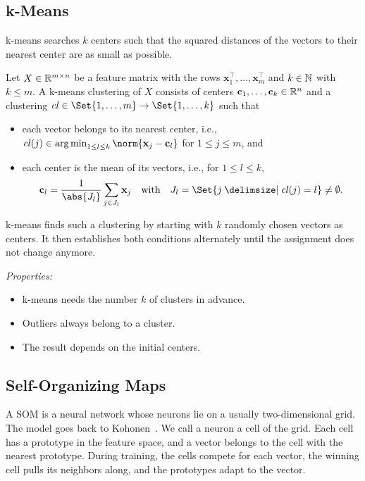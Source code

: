 \subsection{k-Means}
\label{sec:prelim:kmeans}
k-means searches $k$ centers such that the squared distances of the vectors to their nearest center are as small as possible.

\begin{definition}[k-Means]
	\label{def:prelim:kmeans}
	Let $X \in \mathbb R^{m \times n}$ be a feature matrix with the rows $\mathbf{x}_1^\top, \allowbreak \dots, \allowbreak \mathbf{x}_m^\top$ and $k \in \mathbb N$ with $k \le m$. A k-means clustering of $X$ consists of centers $\mathbf{c}_1, \dots, \mathbf{c}_k \in \mathbb R^n$ and a clustering $\mathit{cl} \in \Set{1, \dots, m} \to \Set{1, \dots, k}$ such that
	\begin{itemize}
		\item each vector belongs to its nearest center, i.e., $\mathit{cl}(j) \in \argmin_{1 \le l \le k} \norm{\mathbf{x}_j - \mathbf{c}_l}$ for $1 \le j \le m$, and
		\item each center is the mean of its vectors, i.e., for $1 \le l \le k$,
		      \[
			      \mathbf{c}_l = \frac{1}{\abs{J_l}} \sum_{j \in J_l} \mathbf{x}_j
			      \quad\text{with}\quad
			      J_l = \Set{j \given \mathit{cl}(j) = l} \neq \emptyset.
		      \]
	\end{itemize}
\end{definition}

k-means finds such a clustering by starting with $k$ randomly chosen vectors as centers. It then establishes both conditions alternately until the assignment does not change anymore.

\medskip
\noindent\emph{Properties:}
\begin{itemize}[beginpenalty=10000]
	\item k-means needs the number $k$ of clusters in advance.
	\item Outliers always belong to a cluster.
	\item The result depends on the initial centers.
\end{itemize}

\subsection{Self-Organizing Maps}
\label{sec:prelim:som}
A SOM is a neural network whose neurons lie on a usually two-dimensional grid. The model goes back to Kohonen~\autocite{haykin2009neural}. We call a neuron a cell of the grid. Each cell has a prototype in the feature space, and a vector belongs to the cell with the nearest prototype. During training, the cells compete for each vector, the winning cell pulls its neighbors along, and the prototypes adapt to the vector.

